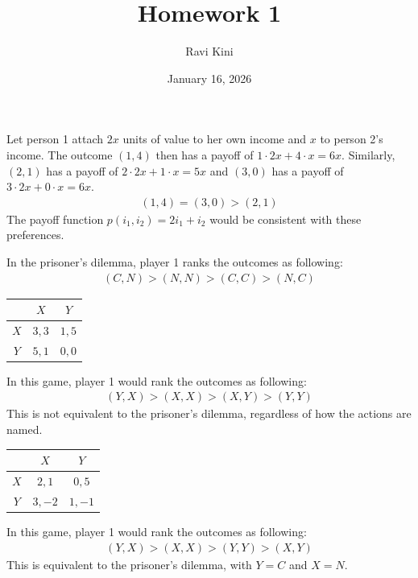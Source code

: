 \documentclass{article}
\title{Homework 1}
\author{Ravi Kini}
\date{January 16, 2026}
\begin{document}
\maketitle

\problem{}
Let person 1 attach $2x$ units of value to her own income and $x$ to person 2's income. The outcome $(1, 4)$ then has a payoff of $1 \cdot 2x + 4 \cdot x = 6x$. Similarly, $(2, 1)$ has a payoff of $2 \cdot 2x + 1 \cdot x = 5x$ and $(3, 0)$ has a payoff of $3 \cdot 2x + 0 \cdot x = 6x$.
\begin{align*}
    (1, 4) = (3, 0) > (2, 1)
\end{align*}
The payoff function $p(i_1, i_2) = 2i_1 + i_2$ would be consistent with these preferences.

\clearpage
\problem{}
In the prisoner's dilemma, player 1 ranks the outcomes as following:
\begin{align*}
    (C, N) > (N, N) > (C, C) > (N, C)
\end{align*}
\begin{center}
\begin{tabular}{|c|c|c|}
    \hline
     & $X$ & $Y$ \\
     \hline
     $X$ & $3, 3$ & $1, 5$ \\
     \hline
     $Y$ & $5, 1$ & $0, 0$ \\
     \hline
\end{tabular}
\end{center}
In this game, player 1 would rank the outcomes as following:
\begin{align*}
    (Y, X) > (X, X) > (X, Y) > (Y, Y)
\end{align*}
This is not equivalent to the prisoner's dilemma, regardless of how the actions are named.
\begin{center}
\begin{tabular}{|c|c|c|}
    \hline
     & $X$ & $Y$ \\
     \hline
     $X$ & $2, 1$ & $0, 5$ \\
     \hline
     $Y$ & $3, -2$ & $1, -1$ \\
     \hline
\end{tabular}
\end{center}
In this game, player 1 would rank the outcomes as following:
\begin{align*}
    (Y, X) > (X, X) > (Y, Y) > (X, Y)
\end{align*}
This is equivalent to the prisoner's dilemma, with $Y = C$ and $X = N$.
\end{document}
